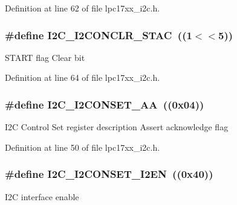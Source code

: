 \-Definition at line 62 of file lpc17xx\-\_\-i2c.\-h.

\hypertarget{group___i2_c___private___macros_gab6148bf41d7fc32bd259d2f6a7d7667d}{
\subsubsection[{\-I2\-C\-\_\-\-I2\-C\-O\-N\-C\-L\-R\-\_\-\-S\-T\-A\-C}]{\setlength{\rightskip}{0pt plus 5cm}\#define {\bf \-I2\-C\-\_\-\-I2\-C\-O\-N\-C\-L\-R\-\_\-\-S\-T\-A\-C}~((1$<$$<$5))}}\label{group___i2_c___private___macros_gab6148bf41d7fc32bd259d2f6a7d7667d}
\-S\-T\-A\-R\-T flag \-Clear bit 

\-Definition at line 64 of file lpc17xx\-\_\-i2c.\-h.

\hypertarget{group___i2_c___private___macros_ga784c4b2fe7f3299e338655d2ddbf283c}{
\subsubsection[{\-I2\-C\-\_\-\-I2\-C\-O\-N\-S\-E\-T\-\_\-\-A\-A}]{\setlength{\rightskip}{0pt plus 5cm}\#define {\bf \-I2\-C\-\_\-\-I2\-C\-O\-N\-S\-E\-T\-\_\-\-A\-A}~((0x04))}}\label{group___i2_c___private___macros_ga784c4b2fe7f3299e338655d2ddbf283c}
\-I2\-C \-Control \-Set register description \-Assert acknowledge flag 

\-Definition at line 50 of file lpc17xx\-\_\-i2c.\-h.

\hypertarget{group___i2_c___private___macros_gab836acc31e0572bb0d0db614f0641f15}{
\subsubsection[{\-I2\-C\-\_\-\-I2\-C\-O\-N\-S\-E\-T\-\_\-\-I2\-E\-N}]{\setlength{\rightskip}{0pt plus 5cm}\#define {\bf \-I2\-C\-\_\-\-I2\-C\-O\-N\-S\-E\-T\-\_\-\-I2\-E\-N}~((0x40))}}\label{group___i2_c___private___macros_gab836acc31e0572bb0d0db614f0641f15}
\-I2\-C interface enable 

